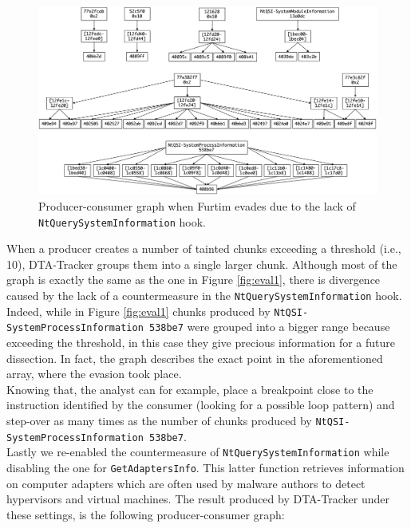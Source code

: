 \documentclass[LaM,binding=0.6cm]{sapthesis}
\begin{document}
\begin{figure}[h!]
\centering%
\includegraphics[width=\textwidth]{images/eval2_def}
\caption{Producer-consumer graph when Furtim evades due to the lack of \texttt{NtQuerySystemInformation} hook.}
\end{figure}

When a producer creates a number of tainted chunks exceeding a threshold (i.e., 10), DTA-Tracker groups them into a single larger chunk. Although most of the graph is exactly the same as the one in Figure \autoref{fig:eval1}, there is divergence caused by the lack of a countermeasure in the \texttt{NtQuerySystemInformation} hook. Indeed, while in Figure \autoref{fig:eval1} chunks produced by \texttt{NtQSI-SystemProcessInformation 538be7} were grouped into a bigger range because exceeding the threshold, in this case they give precious information for a future dissection. In fact, the graph describes the exact point in the aforementioned array, where the evasion took place.\\ 
Knowing that, the analyst can for example, place a breakpoint close to the instruction identified by the consumer (looking for a possible loop pattern) and step-over as many times as the number of chunks produced by \texttt{NtQSI-SystemProcessInformation 538be7}.\\

Lastly we re-enabled the countermeasure of \texttt{NtQuerySystemInformation} while disabling the one for \texttt{GetAdaptersInfo}. This latter function retrieves information on computer adapters which are often used by malware authors to detect hypervisors and virtual machines. The result produced by DTA-Tracker under these settings, is the following producer-consumer graph:
\end{document}
